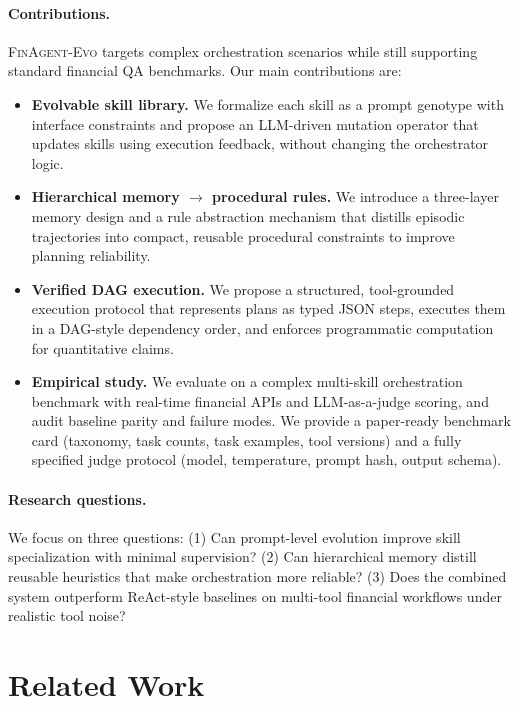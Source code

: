 \documentclass{article}
\begin{document}
\paragraph{Contributions.}
\textsc{FinAgent-Evo} targets complex orchestration scenarios while still supporting standard financial QA benchmarks. Our main contributions are:
\begin{itemize}
  \item \textbf{Evolvable skill library.} We formalize each skill as a prompt genotype with interface constraints and propose an LLM-driven mutation operator that updates skills using execution feedback, without changing the orchestrator logic.
  \item \textbf{Hierarchical memory $\rightarrow$ procedural rules.} We introduce a three-layer memory design and a rule abstraction mechanism that distills episodic trajectories into compact, reusable procedural constraints to improve planning reliability.
  \item \textbf{Verified DAG execution.} We propose a structured, tool-grounded execution protocol that represents plans as typed JSON steps, executes them in a DAG-style dependency order, and enforces programmatic computation for quantitative claims.
  \item \textbf{Empirical study.} We evaluate on a complex multi-skill orchestration benchmark with real-time financial APIs and LLM-as-a-judge scoring, and audit baseline parity and failure modes. We provide a paper-ready benchmark card (taxonomy, task counts, task examples, tool versions) and a fully specified judge protocol (model, temperature, prompt hash, output schema).
\end{itemize}

\paragraph{Research questions.}
We focus on three questions: (1) Can prompt-level evolution improve skill specialization with minimal supervision? (2) Can hierarchical memory distill reusable heuristics that make orchestration more reliable? (3) Does the combined system outperform ReAct-style baselines on multi-tool financial workflows under realistic tool noise?

\section{Related Work}
\end{document}
